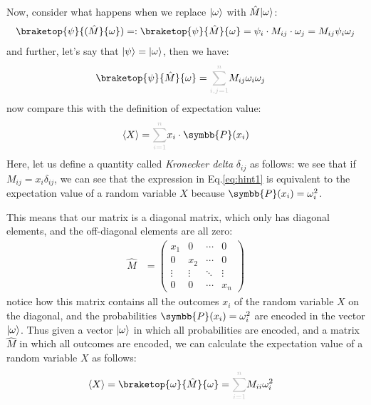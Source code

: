 Now, consider what happens when we replace $\lvert\omega\rangle$ with $\hat{M} \lvert\omega\rangle$:
\begin{align}
  \braketop{\psi}{(\hat{M}}{\omega}) = : \braketop{\psi}{\hat{M}}{\omega} = \psi_i \cdot M_{ij} \cdot \omega_j
  = M_{ij} \psi_i \omega_j
\end{align}
and further, let's say that $\lvert\psi\rangle = \lvert\omega\rangle$, then we have:
\begin{align}
  \braketop{\psi}{\hat{M}}{\omega} & = \textcolor{gray!50}{\sum_{i, j = 1}^{n}} M_{ij} \omega_i \omega_j
  \label{eq:hint1}
\end{align}
now compare this with the definition of expectation value:
\begin{align}
  \expect{X} = \textcolor{gray!50}{\sum_{i=1}^{n}} x_i \cdot \symbb{P}(x_i)
\end{align}
Here, let us define a quantity called \emph{Kronecker delta} $\delta_{ij}$ as follows:
we see that if $M_{ij} = x_i \delta_{ij}$, we can see that the expression in Eq.\eqref{eq:hint1} is equivalent to the expectation value of a random variable $X$ because $\symbb{P}(x_i) = \omega_i^2$.

This means that our matrix is a diagonal matrix, which only has diagonal elements, and the off-diagonal elements are all zero:
\begin{align}
  \hat{M} & = \begin{pmatrix}
                x_1    & 0      & \cdots & 0      \\
                0      & x_2    & \cdots & 0      \\
                \vdots & \vdots & \ddots & \vdots \\
                0      & 0      & \cdots & x_n
              \end{pmatrix}
\end{align}
notice how this matrix contains all the outcomes $x_i$ of the random variable $X$ on the diagonal, and the probabilities $\symbb{P}(x_i) = \omega_i^2$ are encoded in the vector $\lvert\omega\rangle$.
Thus given a vector $\lvert\omega\rangle$ in which all probabilities are encoded, and a matrix $\hat{M}$ in which all outcomes are encoded, we can calculate the expectation value of a random variable $X$ as follows:
\begin{align}
  \expect{X} & = \braketop{\omega}{\hat{M}}{\omega} = \textcolor{gray!50}{\sum_{i = 1}^{n}} M_{ii} \omega_i^2
\end{align}

